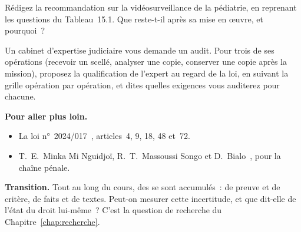 \begin{boxexo}[title={\ding{45}\quad Exercice~15.3. La caméra \niveaumoyen}]
Rédigez la recommandation sur la vidéosurveillance de la pédiatrie, en
reprenant les questions du Tableau~15.1. Que reste-t-il \NEK{} après sa mise
en œuvre, et pourquoi~?
\end{boxexo}

\begin{boxexo}[title={\ding{45}\quad Exercice~15.4. Un cabinet d'expertise \niveauexpert}]
Un cabinet d'expertise judiciaire vous demande un audit. Pour trois de ses
opérations (recevoir un scellé, analyser une copie, conserver une copie
après la mission), proposez la qualification de l'expert au regard de la
loi, en suivant la grille opération par opération, et dites quelles
exigences vous audit\-erez pour chacune.
\end{boxexo}

\bigskip

\begin{boxinfo}
\textbf{Pour aller plus loin.}
\begin{itemize}
    \item La loi n°~2024/017~\cite{loi2024017}, articles~4, 9, 18, 48 et~72.
    \item T.~E.~Minka Mi Nguidjoï, R.~T.~Massoussi Songo et
          D.~Bialo~\cite{minka2026chainepenale}, pour la chaîne pénale.
\end{itemize}
\end{boxinfo}

\begin{boxinfo}
\textbf{Transition.} Tout au long du cours, des \NEK{} se sont accumulés~: de
preuve et de critère, de faits et de textes. Peut-on mesurer cette
incertitude, et que dit-elle de l'état du droit lui-même~? C'est la
question de recherche du Chapitre~\ref{chap:recherche}.
\end{boxinfo}

